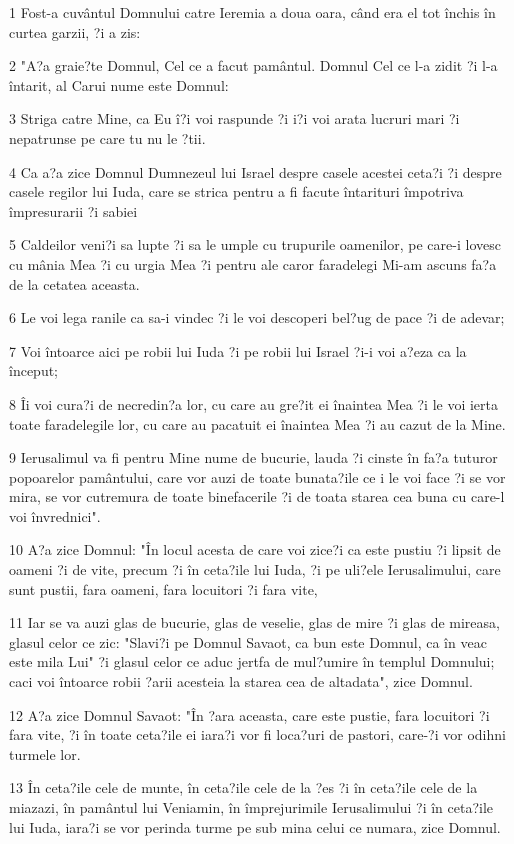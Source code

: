 \par 1 Fost-a cuvântul Domnului catre Ieremia a doua oara, când era el tot închis în curtea garzii, ?i a zis:
\par 2 "A?a graie?te Domnul, Cel ce a facut pamântul. Domnul Cel ce l-a zidit ?i l-a întarit, al Carui nume este Domnul:
\par 3 Striga catre Mine, ca Eu î?i voi raspunde ?i i?i voi arata lucruri mari ?i nepatrunse pe care tu nu le ?tii.
\par 4 Ca a?a zice Domnul Dumnezeul lui Israel despre casele acestei ceta?i ?i despre casele regilor lui Iuda, care se strica pentru a fi facute întarituri împotriva împresurarii ?i sabiei
\par 5 Caldeilor veni?i sa lupte ?i sa le umple cu trupurile oamenilor, pe care-i lovesc cu mânia Mea ?i cu urgia Mea ?i pentru ale caror faradelegi Mi-am ascuns fa?a de la cetatea aceasta.
\par 6 Le voi lega ranile ca sa-i vindec ?i le voi descoperi bel?ug de pace ?i de adevar;
\par 7 Voi întoarce aici pe robii lui Iuda ?i pe robii lui Israel ?i-i voi a?eza ca la început;
\par 8 Îi voi cura?i de necredin?a lor, cu care au gre?it ei înaintea Mea ?i le voi ierta toate faradelegile lor, cu care au pacatuit ei înaintea Mea ?i au cazut de la Mine.
\par 9 Ierusalimul va fi pentru Mine nume de bucurie, lauda ?i cinste în fa?a tuturor popoarelor pamântului, care vor auzi de toate bunata?ile ce i le voi face ?i se vor mira, se vor cutremura de toate binefacerile ?i de toata starea cea buna cu care-l voi învrednici".
\par 10 A?a zice Domnul: "În locul acesta de care voi zice?i ca este pustiu ?i lipsit de oameni ?i de vite, precum ?i în ceta?ile lui Iuda, ?i pe uli?ele Ierusalimului, care sunt pustii, fara oameni, fara locuitori ?i fara vite,
\par 11 Iar se va auzi glas de bucurie, glas de veselie, glas de mire ?i glas de mireasa, glasul celor ce zic: "Slavi?i pe Domnul Savaot, ca bun este Domnul, ca în veac este mila Lui" ?i glasul celor ce aduc jertfa de mul?umire în templul Domnului; caci voi întoarce robii ?arii acesteia la starea cea de altadata", zice Domnul.
\par 12 A?a zice Domnul Savaot: "În ?ara aceasta, care este pustie, fara locuitori ?i fara vite, ?i în toate ceta?ile ei iara?i vor fi loca?uri de pastori, care-?i vor odihni turmele lor.
\par 13 În ceta?ile cele de munte, în ceta?ile cele de la ?es ?i în ceta?ile cele de la miazazi, în pamântul lui Veniamin, în împrejurimile Ierusalimului ?i în ceta?ile lui Iuda, iara?i se vor perinda turme pe sub mina celui ce numara, zice Domnul.
